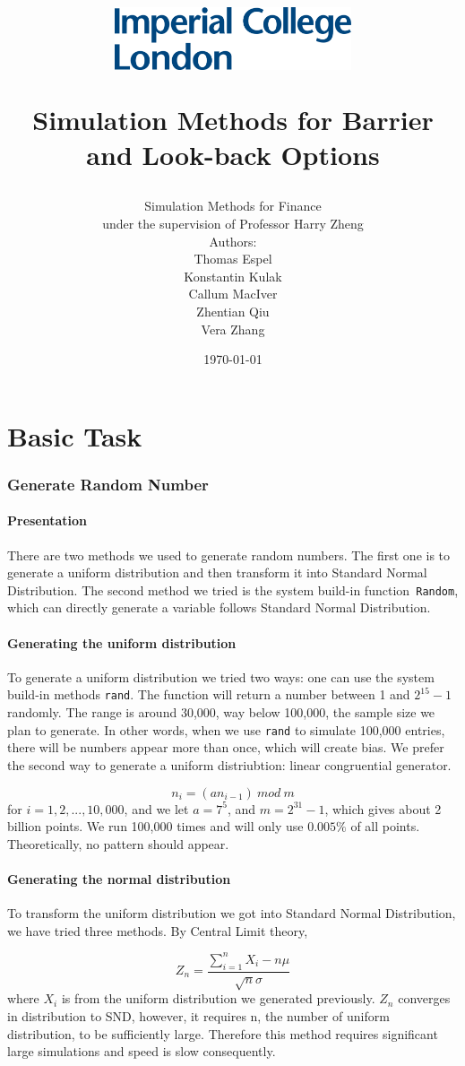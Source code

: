 \documentclass[11pt,a4paper,fleqn]{article}
\author{{\LARGE Simulation Methods for Finance}\\under the supervision of Professor Harry Zheng
\\[5cm] Authors:\\
Thomas Espel\\ Konstantin Kulak\\ Callum MacIver\\Zhentian Qiu\\Vera Zhang\\[6.5cm]}
\title{\vspace*{-2cm}\begin{flushleft}\includegraphics[width=7cm]{imperial.png}\end{flushleft}
\vspace*{4cm}
\Huge\sffamily Simulation Methods for Barrier and Look-back Options}
\date{\sffamily\today}
\begin{document}
\maketitle
\thispagestyle{empty}

\newpage
\tableofcontents
\newpage
\setcounter{page}{1}

\part{Basic Task}
\section{Generate Random Number}
\subsection{Presentation}
There are two methods we used to generate random numbers.
The first one is to generate a uniform distribution and then transform it into Standard Normal Distribution. The second method we tried is the system build-in function\texttt{ Random}, which can directly generate a variable follows Standard Normal Distribution.
\subsection{Generating the uniform distribution}
To generate a uniform distribution we tried two ways: one can use the system build-in methods \texttt{rand}. The function will return a number between 1 and $2^{15} -1$ randomly. The range is around 30,000, way below 100,000, the sample size we plan to generate. In other words, when we use \texttt{rand} to simulate 100,000 entries, there will be numbers appear more than once, which will create bias. We prefer the second way to generate a uniform distriubtion: linear congruential generator.

$$n_i = (an_{i-1}) \ mod\ m$$for $i=1,2,...,10,000$, and we let $ a = 7^5$, and $m = 2^{31}-1$, which gives about 2 billion points. We run 100,000 times and will only use $0.005\%$ of all points. Theoretically, no pattern should appear.
\subsection{Generating the normal distribution}
To transform the uniform distribution we got into Standard Normal Distribution, we have tried three methods. By Central Limit theory,

$$ Z_n = \frac{\sum_{i=1}^{n}X_i-n\mu}{\sqrt{n}\sigma}$$where $X_i$ is from the uniform distribution we generated previously. $Z_n$ converges in distribution to SND, however, it requires n, the number of uniform distribution, to be sufficiently large. Therefore this method requires significant large simulations and speed is slow consequently.
\end{document}
